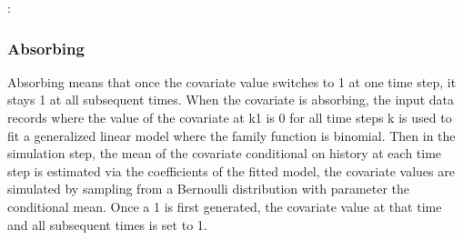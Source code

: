 \documentclass[letterpaper,10pt,english]{sphinxmanual}
\begin{document}
\begin{sphinxVerbatim}[commandchars=\\\{\}]
        
                  
               \PYG{p}{[} \PYG{p}{]}
               \PYG{p}{[} \PYG{p}{]}
               
              
              
\end{sphinxVerbatim}

\sphinxAtStartPar
{}:
\begin{quote}

\end{quote}


\subsubsection{Absorbing}
\label{\detokenize{Specifications/Covariate models:absorbing}}
\sphinxAtStartPar
Absorbing means that once the covariate value switches to 1 at one time step, it stays 1 at all subsequent times.
When the covariate is absorbing, the input data records where the value of the covariate at k\sphinxhyphen{}1 is 0
for all time steps k is used to fit a generalized linear model where the family function is binomial.
Then in the simulation step, the mean of the covariate conditional on history
at each time step is estimated via the coefficients of the fitted model, the covariate values are simulated
by sampling from a Bernoulli distribution with parameter the conditional mean. Once a 1 is first generated, the covariate value at that
time and all subsequent times is set to 1.
\end{document}
